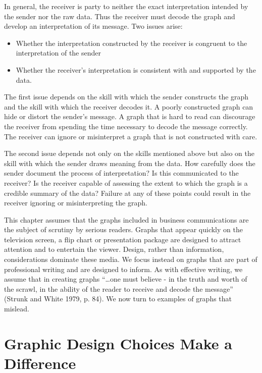 In general, the receiver is party to neither the exact
interpretation intended by the sender nor the raw data. Thus the
receiver must decode the graph and develop an interpretation of its
message. Two issues arise:
\begin{itemize}
\item Whether the interpretation constructed
by the receiver is congruent to the interpretation of the sender

\item Whether the receiver's
interpretation is consistent with and supported by the data.

\end{itemize}

The first issue depends on the skill with which the sender
constructs the graph and the skill with which the receiver decodes
it. A poorly constructed graph can hide or distort the sender's
message. A graph that is hard to read can discourage the receiver
from spending the time necessary to decode the message correctly.
The receiver can ignore or misinterpret a graph that is not
constructed with care.

The second issue depends not only on the skills mentioned above but
also on the skill with which the sender draws meaning from the data.
How carefully does the sender document the process of
interpretation? Is this communicated to the receiver? Is the
receiver capable of assessing the extent to which the graph is a
credible summary of the data? Failure at any of these points could
result in the receiver ignoring or misinterpreting the graph.

This chapter assumes that the graphs included in business
communications are the subject of scrutiny by serious readers.
Graphs that appear quickly on the television screen, a flip chart or
presentation package are designed to attract attention and to
entertain the viewer. Design, rather than information,
considerations dominate these media. We focus instead on graphs that
are part of professional writing and are designed to inform. As with
effective writing, we assume that in creating graphs ``\ldots one
must believe - in the truth and worth of the scrawl, in the ability
of the reader to receive and decode the message'' (Strunk and White
1979, p. 84). We now turn to examples of graphs that mislead.

\section{Graphic Design Choices Make a Difference}\label{S21:GDesign}

